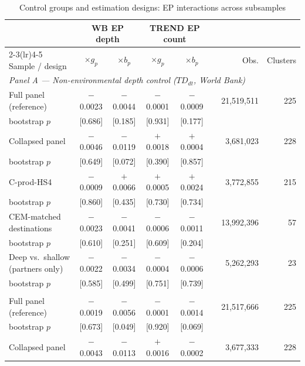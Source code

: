 \begin{table}[htbp]
\centering
\footnotesize
\setlength{\tabcolsep}{4pt}
\caption{Control groups and estimation designs: EP interactions across subsamples}
\label{tab:subsamples}
\begin{threeparttable}
\begin{tabular}{lcccccrr}
\toprule
 & \multicolumn{2}{c}{WB EP depth} & \multicolumn{2}{c}{TREND EP count} & & & \\
\cmidrule(lr){2-3}\cmidrule(lr){4-5}
Sample / design & $\times g_p$ & $\times b_p$ & $\times g_p$ & $\times b_p$ & & Obs. & Clusters \\
\midrule
\multicolumn{8}{l}{\textit{Panel A --- Non-environmental depth control ($TD_{dt}$, World Bank)}} \\[3pt]
Full panel (reference)      & $-$0.0023 & $-$0.0044 & $-$0.0001 & $-$0.0009 & & 21,519,511 & 225 \\
\quad bootstrap $p$         & [0.686] & [0.185] & [0.931] & [0.177] & & & \\[4pt]
Collapsed panel             & $-$0.0046 & $-$0.0119 & $+$0.0018 & $+$0.0004 & & 3,681,023 & 228 \\
\quad bootstrap $p$         & [0.649] & [0.072] & [0.390] & [0.857] & & & \\[4pt]
C-prod-HS4                  & $-$0.0009 & $+$0.0066 & $+$0.0005 & $+$0.0024 & & 3,772,855 & 215 \\
\quad bootstrap $p$         & [0.860] & [0.435] & [0.730] & [0.734] & & & \\[4pt]
CEM-matched destinations    & $-$0.0023 & $-$0.0041 & $-$0.0006 & $-$0.0011 & & 13,992,396 & 57 \\
\quad bootstrap $p$         & [0.610] & [0.251] & [0.609] & [0.204] & & & \\[4pt]
Deep vs.\ shallow (partners only) & $-$0.0022 & $-$0.0034 & $-$0.0004 & $-$0.0006 & & 5,262,293 & 23 \\
\quad bootstrap $p$         & [0.585] & [0.499] & [0.751] & [0.739] & & & \\
\addlinespace[6pt]
\midrule
\multicolumn{8}{l}{\textit{Panel B --- DESTA depth control}} \\[3pt]
Full panel (reference)      & $-$0.0019 & $-$0.0056 & $-$0.0001 & $-$0.0014 & & 21,517,666 & 225 \\
\quad bootstrap $p$         & [0.673] & [0.049] & [0.920] & [0.069] & & & \\[4pt]
Collapsed panel             & $-$0.0043 & $-$0.0113 & $+$0.0016 & $-$0.0002 & & 3,677,333 & 228 \\

\end{tabular}
\end{threeparttable}
\end{table}
